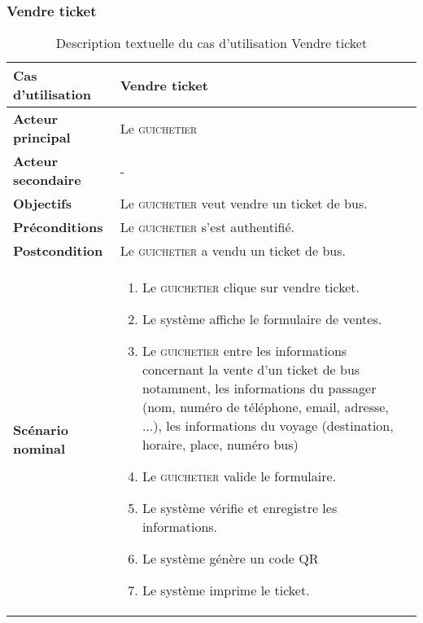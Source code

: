         \subsubsection[Vendre ticket]{Vendre ticket}
        \begin{longtable}{p{4cm} p{9cm}}
            \caption{Description textuelle du cas d’utilisation Vendre ticket}
            \label{table:usecaseVendreBill}
            \\\hline\hline
                \textbf{Cas d’utilisation} & \textbf{Vendre ticket}
            \\\hline\hline
                    \textbf{Acteur principal} & Le \textsc{guichetier}
                \\
                    \textbf{Acteur secondaire} & -
                \\
                    \textbf{Objectifs} & Le \textsc{guichetier} veut vendre un ticket de bus.
                \\
                    \textbf{Préconditions} & Le \textsc{guichetier} s’est authentifié.
                \\
                    \textbf{Postcondition} & Le \textsc{guichetier} a vendu un ticket de bus.
                \\
                \textbf{Scénario nominal} &
                    \begin{enumerate}[leftmargin=*]
                        \item Le \textsc{guichetier} clique sur vendre ticket.
                        \item Le système affiche le formulaire de ventes.
                        \item Le \textsc{guichetier} entre les informations concernant
                        la vente d’un ticket de bus notamment, les informations du passager (nom,
                        numéro de téléphone, email, adresse, ...), les informations du voyage
                        (destination, horaire, place, numéro bus)
                        \item Le \textsc{guichetier} valide le formulaire.
                        \item Le système vérifie et enregistre les informations.
                        \item Le système génère un code QR
                        \item Le système imprime le ticket.
                    \end{enumerate}
                \\

\end{longtable}
